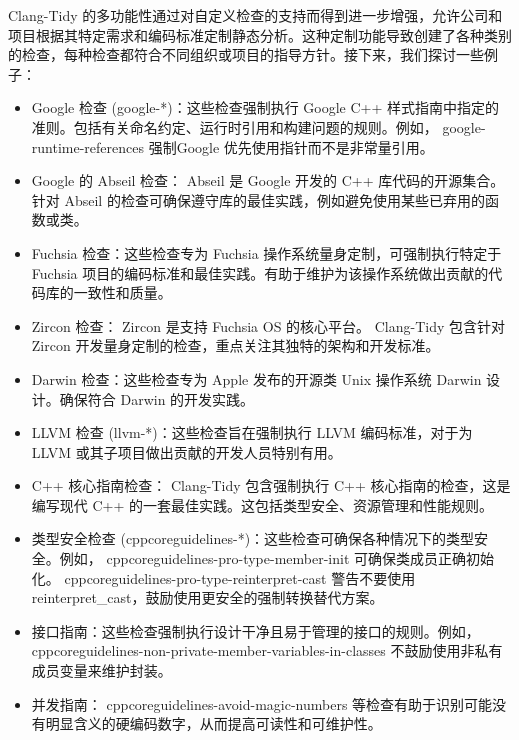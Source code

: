 
Clang-Tidy 的多功能性通过对自定义检查的支持而得到进一步增强，允许公司和项目根据其特定需求和编码标准定制静态分析。这种定制功能导致创建了各种类别的检查，每种检查都符合不同组织或项目的指导方针。接下来，我们探讨一些例子：

\begin{itemize}
\item
Google 检查 (google-*)：这些检查强制执行 Google C++ 样式指南中指定的准则。包括有关命名约定、运行时引用和构建问题的规则。例如， google-runtime-references 强制Google 优先使用指针而不是非常量引用。

\item
Google 的 Abseil 检查： Abseil 是 Google 开发的 C++ 库代码的开源集合。针对 Abseil 的检查可确保遵守库的最佳实践，例如避免使用某些已弃用的函数或类。

\item
Fuchsia 检查：这些检查专为 Fuchsia 操作系统量身定制，可强制执行特定于 Fuchsia 项目的编码标准和最佳实践。有助于维护为该操作系统做出贡献的代码库的一致性和质量。

\item
Zircon 检查： Zircon 是支持 Fuchsia OS 的核心平台。 Clang-Tidy 包含针对 Zircon 开发量身定制的检查，重点关注其独特的架构和开发标准。

\item
Darwin 检查：这些检查专为 Apple 发布的开源类 Unix 操作系统 Darwin 设计。确保符合 Darwin 的开发实践。

\item
LLVM 检查 (llvm-*)：这些检查旨在强制执行 LLVM 编码标准，对于为 LLVM 或其子项目做出贡献的开发人员特别有用。

\item
C++ 核心指南检查： Clang-Tidy 包含强制执行 C++ 核心指南的检查，这是编写现代 C++ 的一套最佳实践。这包括类型安全、资源管理和性能规则。

\item
类型安全检查 (cppcoreguidelines-*)：这些检查可确保各种情况下的类型安全。例如， cppcoreguidelines-pro-type-member-init 可确保类成员正确初始化。 cppcoreguidelines-pro-type-reinterpret-cast 警告不要使用 reinterpret\_cast，鼓励使用更安全的强制转换替代方案。

\item
接口指南：这些检查强制执行设计干净且易于管理的接口的规则。例如， cppcoreguidelines-non-private-member-variables-in-classes 不鼓励使用非私有成员变量来维护封装。

\item
并发指南： cppcoreguidelines-avoid-magic-numbers 等检查有助于识别可能没有明显含义的硬编码数字，从而提高可读性和可维护性。


\end{itemize}
